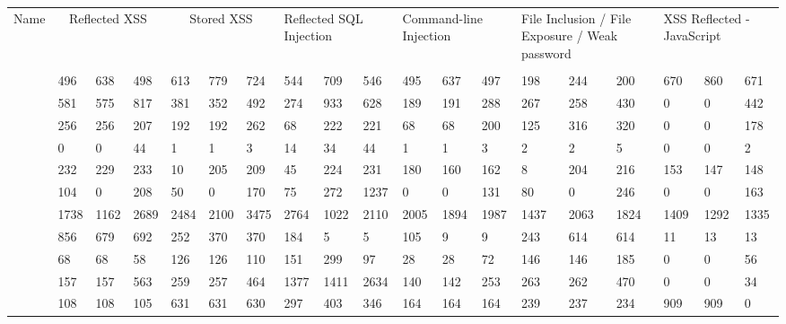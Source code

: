  \begin{table*}[t]
    {\scriptsize
      \begin{tabular}{|l|p{8ex}p{8ex}p{10ex}|p{4ex}p{4ex}p{5ex}|p{4ex}p{4ex}p{5ex}|p{4ex}p{4ex}p{5ex}|p{4ex}p{4ex}p{5ex}|p{4ex}p{4ex}p{5ex}|}
        \hline
        Name & \multicolumn{3}{|c|}{Reflected XSS} & \multicolumn{3}{|c|}{Stored XSS} & \multicolumn{3}{|p{14ex}|}{Reflected SQL Injection} & \multicolumn{3}{|p{15ex}|}{Command-line Injection} & \multicolumn{3}{|p{14ex}|}{File Inclusion / File Exposure / Weak password} & \multicolumn{3}{|p{14ex}|}{XSS Reflected - JavaScript} \\
            & \initial{} & \config{} & \manual{} & & & & & & & & & & & & & & &  \\
          \acunetix{} & 496&638&498   & 613&779&724   & 544&709&546   & 495&637&497   & 198&244&200   & 670&860&671   \\
          \appscan{} & 581&575&817   & 381&352&492   & 274&933&628   & 189&191&288   & 267&258&430   & 0&0&442   \\
          \burp{} & 256&256&207   & 192&192&262   & 68&222&221   & 68&68&200   & 125&316&320   & 0&0&178   \\
          \grendelscan{} & 0&0&44   & 1&1&3   & 14&34&44   & 1&1&3   & 2&2&5   & 0&0&2   \\
          \hailstorm{} & 232&229&233   & 10&205&209   & 45&224&231   & 180&160&162   & 8&204&216   & 153&147&148   \\
          \milescan{} & 104&0&208   & 50&0&170   & 75&272&1237   & 0&0&131   & 80&0&246   & 0&0&163   \\
          \nstalker{} & 1738&1162&2689   & 2484&2100&3475   & 2764&1022&2110   & 2005&1894&1987   & 1437&2063&1824   & 1409&1292&1335   \\
          \ntospider{} & 856&679&692   & 252&370&370   & 184&5&5   & 105&9&9   & 243&614&614   & 11&13&13   \\
          \paros{} & 68&68&58   & 126&126&110   & 151&299&97   & 28&28&72   & 146&146&185   & 0&0&56   \\
          \waf{} & 157&157&563   & 259&257&464   & 1377&1411&2634   & 140&142&253   & 263&262&470   & 0&0&34   \\
          \webinspect{} & 108&108&105   & 631&631&630   & 297&403&346   & 164&164&164   & 239&237&234   & 909&909&0   \\

\end{tabular}}
\end{table*}
